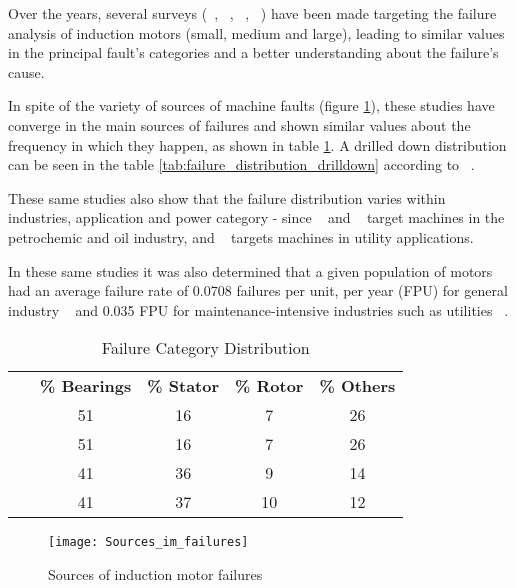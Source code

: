 Over the years, several surveys (~\cite{Bonnett2010}, ~\cite{Thorsen1995}, ~\cite{Mccoy1986}, ~\cite{Bonnett1992}) have been made targeting the failure analysis of induction motors (small, medium and large), leading to similar values in the principal fault's categories and a better understanding about the failure's cause.

In spite of the variety of sources of machine faults (figure \ref{fig:Sources_im_failures}), these studies have converge in the main sources of failures and shown similar values about the frequency in which they happen, as shown in table \ref{tab:failure_distribution}. A drilled down distribution can be seen in the table \ref{tab:failure_distribution_drilldown} according to ~\cite{Mccoy1986}.

These same studies also show that the failure distribution varies within industries, application and power category - since ~\cite{Bonnett2010} and ~\cite{Thorsen1995} target machines in the petrochemic and oil industry, and ~\cite{Mccoy1986} targets machines in utility applications.


In these same studies it was also determined that a given population of motors had an average failure rate of 0.0708 failures per unit, per year (FPU) for general industry ~\cite{Reliability1987} and 0.035 FPU for maintenance-intensive industries such as utilities ~\cite{Mccoy1986}.

\begin{table}[]
\centering
\caption{Failure Category Distribution}
\label{tab:failure_distribution}
\begin{tabular}{ccccc}
\multicolumn{1}{c}{\textbf{}} & \multicolumn{1}{c}{\textbf{\% Bearings}} & \multicolumn{1}{c}{\textbf{\% Stator}} & \multicolumn{1}{c}{\textbf{\% Rotor}} & \multicolumn{1}{c}{\textbf{\% Others}}  \\
~\cite{Bonnett2010}  & 51 & 16 & 7 & 26 \\ 
~\cite{Thorsen1995}  & 51 & 16 & 7 & 26 \\
~\cite{Mccoy1986} 	 & 41 & 36 & 9 & 14 \\
~\cite{Bonnett1992}  & 41 & 37 & 10 & 12 \\                              
\end{tabular}
\end{table}



\begin{figure}[htbp]
	\centering
	\texttt{[image: Sources\_im\_failures]}
	\caption{Sources of induction motor failures}
	\label{fig:Sources_im_failures}
\end{figure}

